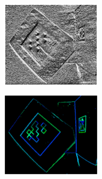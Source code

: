 \begin{figure}[htb]
\begin{minipage}[t]{0.33\linewidth}
		\label{fig:2-10b} 
	\end{minipage}
	\begin{minipage}[t]{0.33\linewidth} 
		\centering
		\includegraphics[width=\columnwidth]{figures/2-10c.png} 
		\label{fig:2-10c} 
	\end{minipage}
	\begin{minipage}[t]{0.33\linewidth}
		\centering
		\includegraphics[width=\columnwidth]{figures/2-10d.png} 

\end{minipage}
\end{figure}

